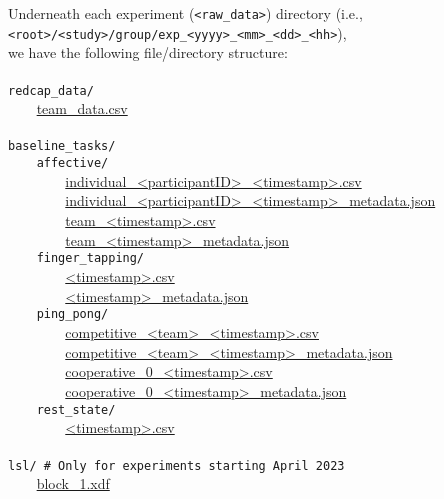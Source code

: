 Underneath each experiment (\verb|<raw_data>|) directory (i.e.,\\
\verb|<root>/<study>/group/exp_<yyyy>_<mm>_<dd>_<hh>|),\\
we have the following file/directory structure:\\\\
%
\verb|redcap_data/|\\
\verb|    |\hyperref[team_data.csv]{team\_data.csv}\\\\
\verb|baseline_tasks/|\\
\verb|    affective/|\\
\verb|        |\hyperref[individual_<participantID>_<timestamp>.csv]{individual\_<participantID>\_<timestamp>.csv}\\
\verb|        |\hyperref[individual_<participantID>_<timestamp>_metadata.json]{individual\_<participantID>\_<timestamp>\_metadata.json}\\
\verb|        |\hyperref[team_<timestamp>.csv]{team\_<timestamp>.csv}\\
\verb|        |\hyperref[team_<timestamp>_metadata.json]{team\_<timestamp>\_metadata.json}\\
\verb|    finger_tapping/|\\
\verb|        |\hyperref[finger_tapping/<timestamp>.csv]{<timestamp>.csv}\\
\verb|        |\hyperref[finger_tapping/<timestamp>_metadata.json]{<timestamp>\_metadata.json}\\
\verb|    ping_pong/|\\
\verb|        |\hyperref[competitive_<team>_<timestamp>.csv]{competitive\_<team>\_<timestamp>.csv}\\
\verb|        |\hyperref[competitive_<team>_<timestamp>_metadata.json]{competitive\_<team>\_<timestamp>\_metadata.json}\\
\verb|        |\hyperref[cooperative_0_<timestamp>.csv]{cooperative\_0\_<timestamp>.csv}\\
\verb|        |\hyperref[cooperative_0_<timestamp>_metadata.json]{cooperative\_0\_<timestamp>\_metadata.json}\\
\verb|    rest_state/|\\
\verb|        |\hyperref[rest_state/<timestamp>.csv]{<timestamp>.csv}\\\\
\verb|lsl/ # Only for experiments starting April 2023|\\
\verb|    |\hyperref[block_1.xdf]{block\_1.xdf}\\
